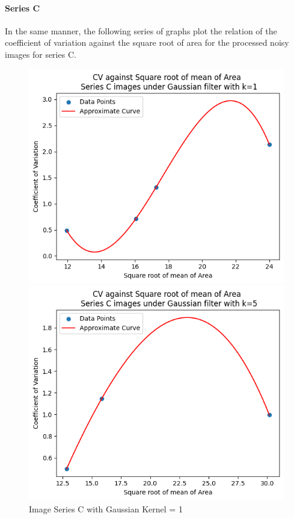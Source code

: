 \documentclass[runningheads]{llncs}
\begin{document}
\paragraph*{\textbf{Series C}}
\par In the same manner, the following series of graphs plot the relation of the coefficient of variation against the square root of area for the processed noisy images for series C. 
\begin{figure}[h!]
\begin{minipage}[h]{0.47\linewidth}
\begin{center}
\includegraphics[width=1\linewidth]{Report/Result_Images/series_C_Gaussian_kernel_1_area.png} 
\caption{Image Series C with Gaussian Kernel = 1}
\label{SeriesC-Gaussian-Kernel1-AreaGraph}
\end{center} 
\end{minipage}
\hfill
\vspace{0.2 cm}
\begin{minipage}[h]{0.47\linewidth}
\begin{center}
\includegraphics[width=1\linewidth]{Report/Result_Images/series_C_Gaussian_kernel_5_area.png} 

\end{center}
\end{minipage}
\end{figure}
\end{document}
